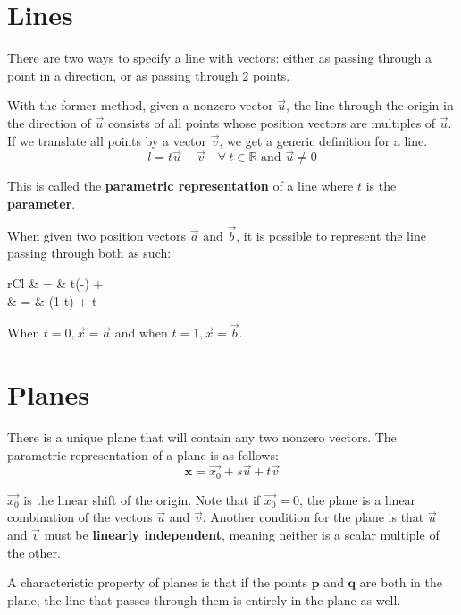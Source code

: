 \documentclass[11pt]{article}
\begin{document}
\section{Lines}
	There are two ways to specify a line with vectors: either as passing through a point in a direction, or as passing through 2 points.
	
	With the former method, given a nonzero vector $\vec{u}$, the line through the origin in the direction of $\vec{u}$ consists of all points whose position vectors are multiples of $\vec{u}$. If we translate all points by a vector $\vec{v}$, we get a generic definition for a line.
	\begin{equation}
		l = t\vec{u} + \vec{v} \quad \forall \ t \in \mathbb{R} \text{ and } \vec{u}\neq 0
	\end{equation}
	
	This is called the \textbf{parametric representation} of a line where $t$ is the \textbf{parameter}.
	
	When given two position vectors $\vec{a} \text{ and } \vec{b}$, it is possible to represent the line passing through both as such:
	
	\begin{IEEEeqnarray}{rCl}
		 & = & t(-\vec{a}) + \\
		 & = & (1-t) + t
	\end{IEEEeqnarray}
	
	When $t=0, \vec{x} = \vec{a}$ and when $t=1, \vec{x} = \vec{b}$.
	
\section{Planes}
	There is a unique plane that will contain any two nonzero vectors. The parametric representation of a plane is as follows:
	\begin{equation}
		\mathbf{x} = \vec{x_0} + s\vec{u} + t\vec{v}
	\end{equation}
	
	$\vec{x_0}$ is the linear shift of the origin. Note that if $\vec{x_0} = 0$, the plane is a linear combination of the vectors $\vec{u}$ and $\vec{v}$. Another condition for the plane is that $\vec{u}$ and $\vec{v}$ must be \textbf{linearly independent}, meaning neither is a scalar multiple of the other.
	
	A characteristic property of planes is that if the points $\mathbf{p}$ and $\mathbf{q}$ are both in the plane, the line that passes through them is entirely in the plane as well.
	
\end{document}
